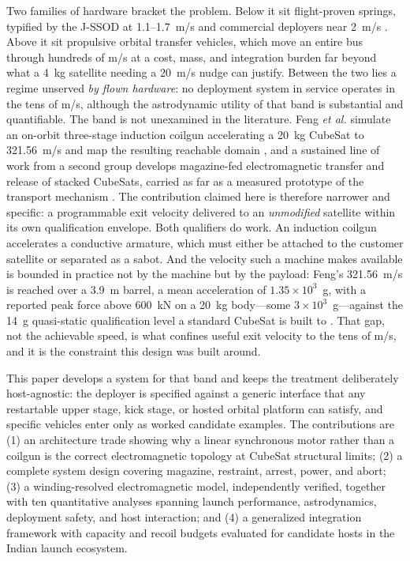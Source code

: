 \documentclass[conference]{IEEEtran}
\begin{document}
Two families of hardware bracket the problem. Below it sit flight-proven springs, typified by the J-SSOD at 1.1--1.7~m/s \cite{jssod} and commercial deployers near 2~m/s \cite{exopod}. Above it sit propulsive orbital transfer vehicles, which move an entire bus through hundreds of m/s at a cost, mass, and integration burden far beyond what a 4~kg satellite needing a 20~m/s nudge can justify. Between the two lies a regime unserved \emph{by flown hardware}: no deployment system in service operates in the tens of m/s, although the astrodynamic utility of that band is substantial and quantifiable. The band is not unexamined in the literature. Feng \emph{et al.} simulate an on-orbit three-stage induction coilgun accelerating a 20~kg CubeSat to 321.56~m/s and map the resulting reachable domain \cite{feng2025}, and a sustained line of work from a second group develops magazine-fed electromagnetic transfer and release of stacked CubeSats, carried as far as a measured prototype of the transport mechanism \cite{stacked2022,xu2024,storage2025}. The contribution claimed here is therefore narrower and specific: a programmable exit velocity delivered to an \emph{unmodified} satellite within its own qualification envelope. Both qualifiers do work. An induction coilgun accelerates a conductive armature, which must either be attached to the customer satellite or separated as a sabot. And the velocity such a machine makes available is bounded in practice not by the machine but by the payload: Feng's 321.56~m/s is reached over a 3.9~m barrel, a mean acceleration of $1.35\times10^3$~g, with a reported peak force above 600~kN on a 20~kg body---some $3\times10^3$~g---against the 14~g quasi-static qualification level a standard CubeSat is built to \cite{gevs}. That gap, not the achievable speed, is what confines useful exit velocity to the tens of m/s, and it is the constraint this design was built around.

This paper develops a system for that band and keeps the treatment deliberately host-agnostic: the deployer is specified against a generic interface that any restartable upper stage, kick stage, or hosted orbital platform can satisfy, and specific vehicles enter only as worked candidate examples. The contributions are (1) an architecture trade showing why a linear synchronous motor rather than a coilgun is the correct electromagnetic topology at CubeSat structural limits; (2) a complete system design covering magazine, restraint, arrest, power, and abort; (3) a winding-resolved electromagnetic model, independently verified, together with ten quantitative analyses spanning launch performance, astrodynamics, deployment safety, and host interaction; and (4) a generalized integration framework with capacity and recoil budgets evaluated for candidate hosts in the Indian launch ecosystem.
\end{document}
